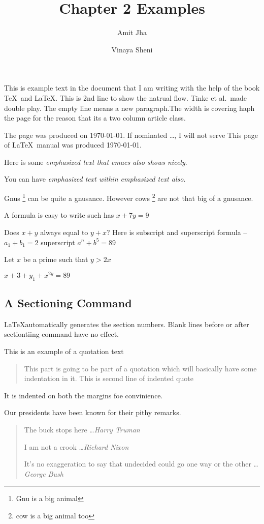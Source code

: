 \documentclass[twocolumn,12pt]{article}
\title{Chapter 2 Examples}
\author{Amit Jha \and Vinaya Sheni}
\begin{document}
\maketitle

This is example text in the document that I am writing with the help of the book \TeX \ and \LaTeX.
This is 2nd line to show the natrual flow.
Tinke et al.\  made double play.
The empty line means a new paragraph.The width is covering haph the page for the reason that its a two column article class.

The page was produced on \today.
If nominated \ldots, I will not serve
This page of \LaTeX\ manual was produced \today.


Here is some \emph{emphasized text that emacs also shows nicely}.

You can have \emph{emphasized text \emph{within} emphasized text also}.

Gnus \footnote{Gnu is a big animal} can be quite a gnusance.
However cows \footnote{cow is a big animal too} are not that big of a gnusance.


A formula is easy to write such has \(x+7y = 9\)

Does \(x  + y \) always equal to \(y+x\)?
Here is subscript and superscript formula -- \(a_1 + b_1 = 2\) superscript \(a^n + b^5 = 89\)

Let $x$ be a prime such that $y > 2x$

\begin{math} x + 3+ y_1 + x^{2y} = 89 \end{math}

\subsection{A Sectioning Command}
\LaTeX automatically generates the section numbers. Blank lines before or after sectiontiing command have no effect.

This is an example of a quotation text
\begin{quote}
  This part is going to be part of a quotation which will basically have some indentation in it.
  This is second line of indented quote
\end{quote}
It is indented on both the margins foe convinience.

Our presidents have been known for their pithy remarks.
\begin{quote}
  The buck stops here \ldots \emph{Harry Truman}

  I am not a crook \ldots \emph{Richard Nixon}

  It's no exaggeration to say that undecided could go one way or the other \ldots \emph{George Bush}
\end{quote}
\end{document}
